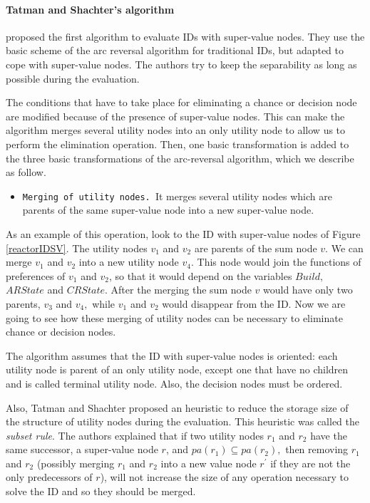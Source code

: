 \paragraph{Tatman and Shachter's algorithm}

\cite{tatman90} proposed the first algorithm to evaluate IDs with
super-value nodes. They use the basic scheme of the arc reversal
algorithm for traditional IDs, but adapted to cope with super-value
nodes. The authors try to keep the separability as long as possible
during the evaluation.

The conditions that have to take place for eliminating a chance or decision
node are modified because of the presence of super-value nodes. This can
make the algorithm merges several utility nodes into an only utility node to
allow us to perform the elimination operation. Then, one basic
transformation is added to the three basic transformations of the
arc-reversal algorithm, which we describe as follow.

\begin{itemize}
\item \texttt{Merging of utility nodes. }It merges several utility nodes
which are parents of the same super-value node into a new super-value node.
\end{itemize}

As an example of this operation, look to the ID with super-value nodes of
Figure \ref{reactorIDSV}. The utility nodes $v_{1}$ and $v_{2}$ are parents
of the sum node $v$. We can merge $v_{1}$ and $v_{2}$ into a new utility
node $v_{4}.$ This node would join the functions of preferences of $v_{1}$
and $v_{2}$, so that it would depend on the variables $Build,$ $ARState$ and
$CRState.$ After the merging the sum node $v$ would have only two parents, $%
v_{3}$ and $v_{4},$ while $v_{1}$ and $v_{2}$ would disappear from the ID.
Now we are going to see how these merging of utility nodes can be necessary
to eliminate chance or decision nodes.

The algorithm assumes that the ID with super-value nodes is oriented: each
utility node is parent of an only utility node, except one that have no
children and is called terminal utility node. Also, the decision nodes must
be ordered.

Also, Tatman and Shachter proposed an heuristic to reduce the storage size
of the structure of utility nodes during the evaluation. This heuristic was
called the \textit{subset rule}. The authors explained that if two utility
nodes $r_{1}$ and $r_{2}$ have the same successor, a super-value node $r$,
and $pa(r_{1})\subseteq pa(r_{2}),$ then removing $r_{1}$ and $r_{2}$
(possibly merging $r_{1}$ and $r_{2}$ into a new value node $r^{\prime }$ if
they are not the only predecessors of $r$), will not increase the size of
any operation necessary to solve the ID and so they should be merged.

